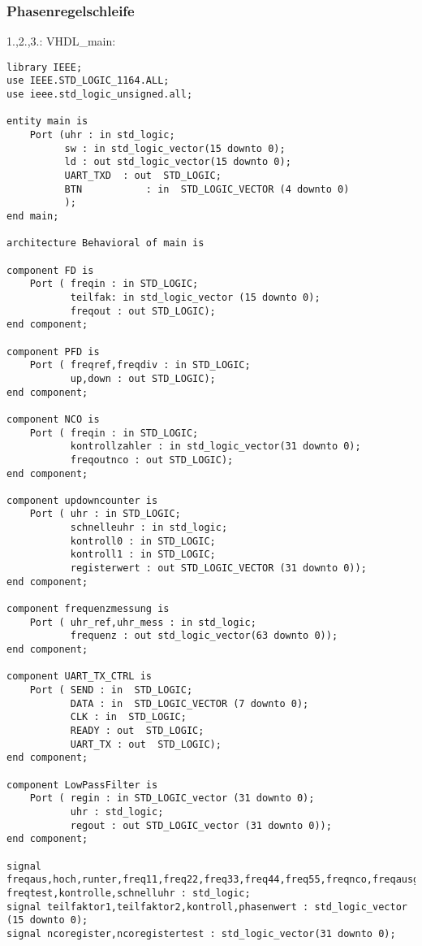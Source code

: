 \documentclass{article}
\begin{document}
\subsubsection{Phasenregelschleife}
1.,2.,3.:\newline
VHDL\_main:\newline
\begin{verbatim}
library IEEE;
use IEEE.STD_LOGIC_1164.ALL;
use ieee.std_logic_unsigned.all;

entity main is
    Port (uhr : in std_logic;
          sw : in std_logic_vector(15 downto 0);
          ld : out std_logic_vector(15 downto 0);
          UART_TXD 	: out  STD_LOGIC;
          BTN 			: in  STD_LOGIC_VECTOR (4 downto 0)
          );
end main;

architecture Behavioral of main is

component FD is
    Port ( freqin : in STD_LOGIC;
           teilfak: in std_logic_vector (15 downto 0);
           freqout : out STD_LOGIC);
end component;

component PFD is
    Port ( freqref,freqdiv : in STD_LOGIC;
           up,down : out STD_LOGIC);
end component;

component NCO is
    Port ( freqin : in STD_LOGIC;
           kontrollzahler : in std_logic_vector(31 downto 0);
           freqoutnco : out STD_LOGIC);
end component;

component updowncounter is
    Port ( uhr : in STD_LOGIC;
           schnelleuhr : in std_logic;
           kontroll0 : in STD_LOGIC;
           kontroll1 : in STD_LOGIC;
           registerwert : out STD_LOGIC_VECTOR (31 downto 0));
end component;

component frequenzmessung is
    Port ( uhr_ref,uhr_mess : in std_logic;
           frequenz : out std_logic_vector(63 downto 0));
end component;

component UART_TX_CTRL is
    Port ( SEND : in  STD_LOGIC;
           DATA : in  STD_LOGIC_VECTOR (7 downto 0);
           CLK : in  STD_LOGIC;
           READY : out  STD_LOGIC;
           UART_TX : out  STD_LOGIC);
end component;

component LowPassFilter is
    Port ( regin : in STD_LOGIC_vector (31 downto 0);
           uhr : std_logic;
           regout : out STD_LOGIC_vector (31 downto 0));
end component;

signal freqaus,hoch,runter,freq11,freq22,freq33,freq44,freq55,freqnco,freqausgang,
freqtest,kontrolle,schnelluhr : std_logic;
signal teilfaktor1,teilfaktor2,kontroll,phasenwert : std_logic_vector (15 downto 0);
signal ncoregister,ncoregistertest : std_logic_vector(31 downto 0);


\end{verbatim}
\end{document}
